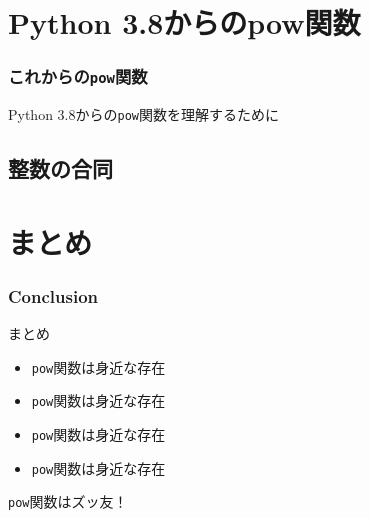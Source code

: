 \documentclass[aspectratio=169,dvipdfmx,14pt,notheorems]{beamer}
\theoremstyle{definition}
\begin{document}
\section{Python 3.8からのpow関数}

\begin{frame}\frametitle{これからの\texttt{pow}関数}
\begin{center}
\Large Python 3.8からの\texttt{pow}関数を理解するために
\end{center}
\end{frame}

\subsection{整数の合同}



\section{まとめ}

\begin{frame}[fragile]\frametitle{Conclusion}
\begin{block}{まとめ}
\begin{itemize}
\item \texttt{pow}関数は身近な存在
\item \texttt{pow}関数は身近な存在
\item \texttt{pow}関数は身近な存在
\item \texttt{pow}関数は身近な存在
\end{itemize}
\end{block}
\texttt{pow}関数はズッ友！
\end{frame}
\end{document}

